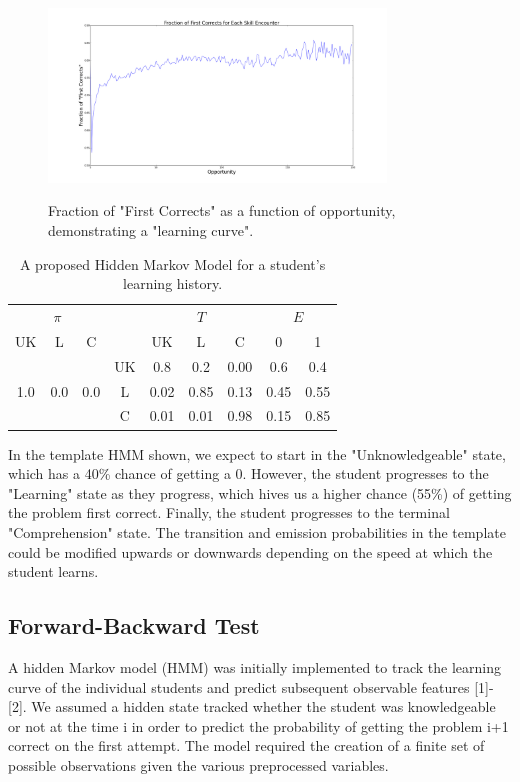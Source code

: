 \documentclass{article} %
\begin{document}
\begin{figure}[h]
\begin{center}
\includegraphics[width=0.8\textwidth]{fracCORR_opp.png}
\label{learning_curve}
\end{center}
\caption{Fraction of "First Corrects" as a function of opportunity, demonstrating a "learning curve".}
\end{figure}


\begin{table}[t]
\begin{center}
\begin{tabular}{ccc|c|ccc|cc}
\multicolumn{3}{c}{$\pi$} && \multicolumn{3}{c}{$T$} & \multicolumn{2}{c}{$E$}\\
UK & L & C & & UK & L & C & 0 & 1\\
& & & UK &0.8 & 0.2 & 0.00  & 0.6 & 0.4\\
1.0 & 0.0 & 0.0 & L & 0.02 & 0.85 & 0.13 & 0.45 & 0.55\\
&&& C & 0.01 & 0.01 & 0.98 & 0.15 & 0.85\\

\end{tabular}
\caption{A proposed Hidden Markov Model for a student's learning history.}\label{HMMprop}
\end{center}
\end{table}

In the template HMM shown, we expect to start in the "Unknowledgeable" state, which has a 40\% chance of getting a 0. However, the student progresses to the "Learning" state as they progress, which hives us a higher chance (55\%) of getting the problem first correct. Finally, the student progresses to the terminal "Comprehension" state. The transition and emission probabilities in the template could be modified upwards or downwards depending on the speed at which the student learns.

\subsection{Forward-Backward Test}
A hidden Markov model (HMM) was initially implemented to track the learning curve of the individual students and predict subsequent observable features [1]-[2]. We assumed a hidden state tracked whether the student was knowledgeable or not at the time i in order to predict the probability of getting the problem i+1 correct on the first attempt. The model required the creation of a finite set of possible observations given the various preprocessed variables. 
\end{document}
